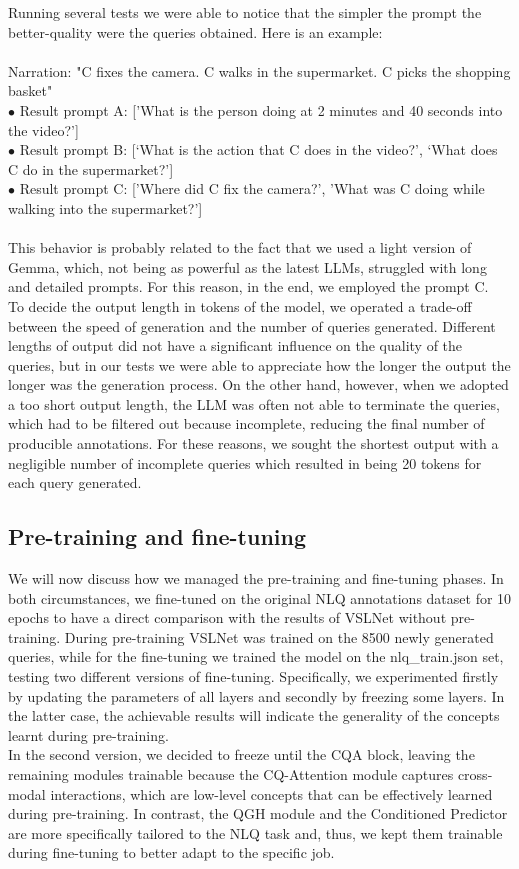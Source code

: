 \documentclass[10pt,twocolumn,letterpaper]{article}
\begin{document}
Running several tests we were able to notice that the simpler the prompt the better-quality were the queries obtained. Here is an example: \\ \\
Narration:  "C fixes the camera.  C walks in the supermarket.  C picks the shopping basket"\\
$\bullet$ Result prompt A: ['What is the person doing at 2 minutes and 40 seconds into the video?'] \\
$\bullet$ Result prompt B: [‘What is the action that C does in the video?’, ‘What does C do in the supermarket?’] \\
$\bullet$ Result prompt C: ['Where did C fix the camera?', 'What was C doing while walking into the supermarket?'] \\\\
This behavior is probably related to the fact that we used a light version of Gemma, which, not being as powerful as the latest LLMs, struggled with long and detailed prompts. For this reason, in the end, we employed the prompt C.\\
To decide the output length in tokens of the model, we operated a trade-off between the speed of generation and the number of queries generated.  Different lengths of output did not have a significant influence on the quality of the queries, but in our tests we were able to appreciate how the longer the output the longer was the generation process. On the other hand, however, when we adopted a too short output length, the LLM was often not able to terminate the queries, which had to be filtered out because incomplete, reducing the final number of producible annotations. For these reasons, we sought the shortest output with a negligible number of incomplete queries which resulted in being 20 tokens for each query generated.

\subsection{Pre-training and fine-tuning}
We will now discuss how we managed the pre-training and fine-tuning phases. In both circumstances, we fine-tuned on the original NLQ annotations dataset for 10 epochs to have a direct comparison with the results of VSLNet without pre-training. During pre-training VSLNet was trained on the 8500 newly generated queries, while for the fine-tuning we trained the model on the nlq\_train.json set, testing two different versions of fine-tuning. Specifically, we experimented firstly by updating the parameters of all layers and secondly by freezing some layers. In the latter case, the achievable results will indicate the generality of the concepts learnt during pre-training.\\
In the second version, we decided to freeze until the CQA block, leaving the remaining modules trainable because the CQ-Attention module captures cross-modal interactions, which are low-level concepts that can be effectively learned during pre-training. In contrast, the QGH module and the Conditioned Predictor are more specifically tailored to the NLQ task and, thus, we kept them trainable during fine-tuning to better adapt to the specific job.
\end{document}
